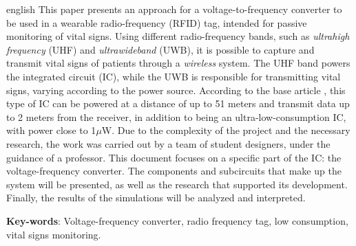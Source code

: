 \begin{resumo}[Abstract]
 \begin{otherlanguage*}{english}
This paper presents an approach for a voltage-to-frequency converter to be used in a wearable radio-frequency (RFID) tag, intended for passive monitoring of vital signs. Using different radio-frequency bands, such as \textit{ultrahigh frequency} (UHF) and \textit{ultrawideband} (UWB), it is possible to capture and transmit vital signs of patients through a \textit{wireless} system. The UHF band powers the integrated circuit (IC), while the UWB is responsible for transmitting vital signs, varying according to the power source. According to the base article \cite{artigo_principal}, this type of IC can be powered at a distance of up to 51 meters and transmit data up to 2 meters from the receiver, in addition to being an ultra-low-consumption IC, with power close to 1$\mu$W. Due to the complexity of the project and the necessary research, the work was carried out by a team of student designers, under the guidance of a professor. This document focuses on a specific part of the IC: the voltage-frequency converter. The components and subcircuits that make up the system will be presented, as well as the research that supported its development. Finally, the results of the simulations will be analyzed and interpreted.

   \vspace{\onelineskip}
 
   \noindent 
   \textbf{Key-words}: Voltage-frequency converter, radio frequency tag, low consumption, vital signs monitoring.
 \end{otherlanguage*}
\end{resumo}
